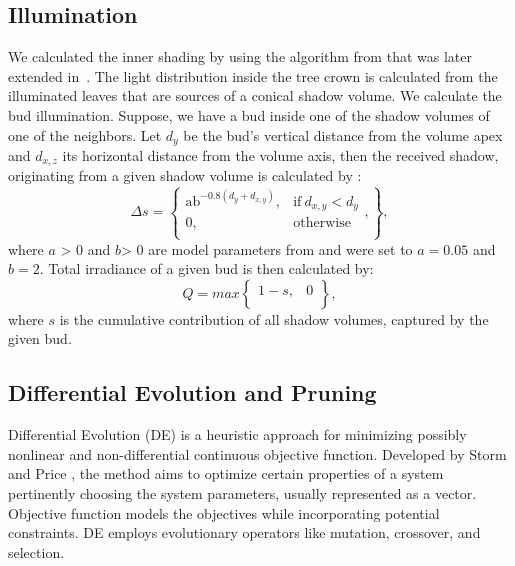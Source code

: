 \subsection{Illumination}

We calculated the inner shading by using the algorithm from \cite{palubicki_self-organizing_2009}
that was later extended in~\cite{pirk_plastic_2012,stava_inverse_2014,strnad_novel_2017}. The light distribution
inside the tree crown is calculated from the illuminated leaves that are
sources of a conical shadow volume. We calculate the bud illumination.
Suppose, we have a bud inside one of the shadow volumes of one of the
neighbors. Let \(d_{y}\) be the bud's vertical distance from the volume
apex and \(d_{x,z}\) its horizontal distance from the volume axis, then
the received shadow, originating from a given shadow volume is
calculated by \cite{strnad_novel_2017}:
\begin{equation}
\Delta s = \left\{ \begin{matrix}
\text{ab}^{- 0.8\left( d_{y} + d_{x,y} \right)}, & \mathrm{\text{if}}\ d_{x,y} < d_{y} \\
0, & \mathrm{otherwise} \\
\end{matrix}, \right\},
\end{equation}
where \(a\) \textgreater{} 0 and \(b\)\textgreater{} 0 are model
parameters from \cite{palubicki_self-organizing_2009} and were set to \(a = 0.05\) and \(b = 2\).
Total irradiance of a given bud is then calculated by:
\begin{equation}
  Q = max\begin{Bmatrix}
1 - s, & 0 \\
\end{Bmatrix},  
\end{equation}
where \(s\) is the cumulative contribution of all shadow volumes,
captured by the given bud.

\subsection{Differential Evolution and Pruning}
Differential Evolution (DE) is a heuristic approach for minimizing
possibly nonlinear and non-differential continuous objective function.
Developed by Storm and Price \cite{storn_differential_1997}, the method aims to optimize
certain properties of a system pertinently choosing the system
parameters, usually represented as a vector. Objective function models
the objectives while incorporating potential constraints. DE employs
evolutionary operators like mutation, crossover, and selection.

